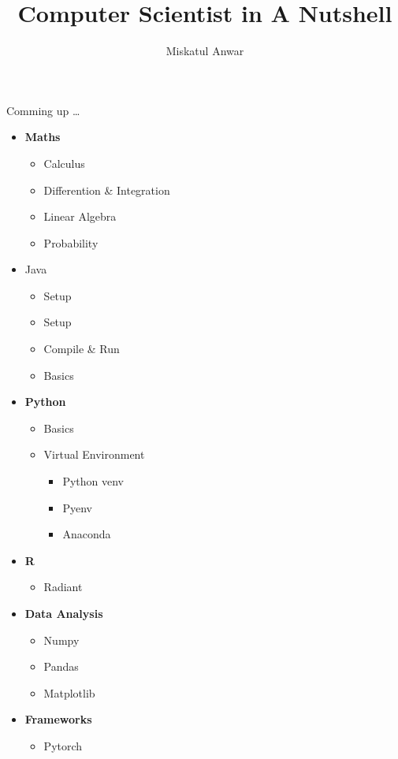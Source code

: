 \documentclass{book}
\title{Computer Scientist in A Nutshell}
\author{Miskatul Anwar}
\begin{document}
\maketitle
\newpage
\begin{flushright}
	Comming up \dots
\end{flushright}
\begin{itemize}
	\item  \textbf{Maths}
	      \begin{itemize}
		      \item Calculus
		      \item Differention \& Integration
		      \item Linear Algebra
		      \item Probability
	      \end{itemize}
	\item Java
	      \begin{itemize}
		      \item Setup
		      \item Setup
		      \item Compile \& Run
		      \item Basics
	      \end{itemize}
	\item \textbf{Python}
	      \begin{itemize}
		      \item Basics
		      \item Virtual Environment
		            \begin{itemize}
			            \item Python venv
			            \item Pyenv
			            \item Anaconda
		            \end{itemize}
	      \end{itemize}
	\item \textbf{R}
	      \begin{itemize}
		      \item Radiant
	      \end{itemize}
	\item  \textbf{Data Analysis}
	      \begin{itemize}
		      \item Numpy
		      \item Pandas
		      \item Matplotlib
	      \end{itemize}
	\item \textbf{Frameworks}
	      \begin{itemize}
		      \item Pytorch
	      \end{itemize}


\end{itemize}
\end{document}
